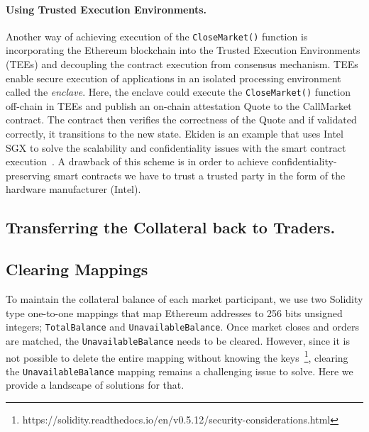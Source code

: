
\paragraph{{Using Trusted Execution Environments.}} Another way of achieving execution of the \texttt{CloseMarket()} function is incorporating the Ethereum blockchain into the Trusted Execution Environments (TEEs) and decoupling the contract execution from consensus mechanism. TEEs enable secure execution of applications in an isolated processing environment called the \textit{enclave}. Here, the enclave could execute the \texttt{CloseMarket()} function off-chain in TEEs and publish an on-chain attestation Quote to the CallMarket contract. The contract then verifies the correctness of the Quote and if validated correctly, it transitions to the new state. Ekiden is an example that uses Intel SGX to solve the scalability and confidentiality issues with the smart contract execution~\cite{cheng2019ekiden}. A drawback of this scheme is in order to achieve confidentiality-preserving smart contracts we have to trust a trusted party in the form of the hardware manufacturer (\eg Intel).


\subsection{Transferring the Collateral back to Traders.}



\subsection{Clearing Mappings}

To maintain the collateral balance of each market participant, we use two Solidity type one-to-one mappings that map Ethereum addresses to 256 bits unsigned integers; \texttt{TotalBalance} and \texttt{UnavailableBalance}. Once market closes and orders are matched, the \texttt{UnavailableBalance} needs to be cleared. However, since it is not possible to delete the entire mapping without knowing the keys~\footnote{https://solidity.readthedocs.io/en/v0.5.12/security-considerations.html}, clearing the \texttt{UnavailableBalance} mapping remains a challenging issue to solve. Here we provide a landscape of solutions for that.

